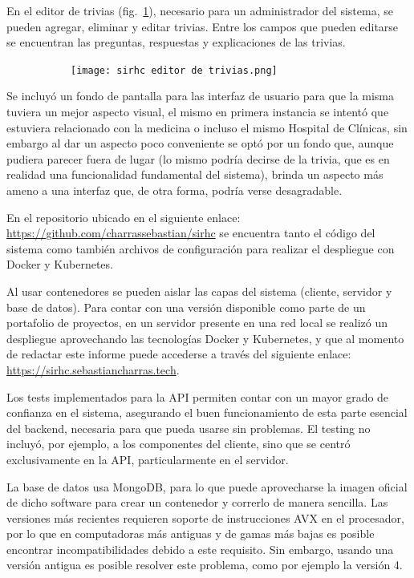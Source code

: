 \documentclass{article}
\begin{document}
\vspace{-1.0\baselineskip}
En el editor de trivias (fig.~\ref{fig:editorTrivias}), necesario para un administrador del sistema, se pueden agregar, eliminar y editar trivias. Entre los campos que pueden editarse se encuentran las preguntas, respuestas y explicaciones de las trivias.
\begin{figure}[H]
	\caption{Interfaz del editor de trivias}
    \begin{subfigure}{1\textwidth}
	\texttt{[image: sirhc editor de trivias.png]}
    \end{subfigure}
	\label{fig:editorTrivias}
\end{figure}
\vspace{-1.0\baselineskip}
Se incluyó un fondo de pantalla para las interfaz de usuario para que la misma tuviera un mejor aspecto visual, el mismo en primera instancia se intentó que estuviera relacionado con la medicina o incluso el mismo Hospital de Clínicas, sin embargo al dar un aspecto poco conveniente se optó por un fondo que, aunque pudiera parecer fuera de lugar (lo mismo podría decirse de la trivia, que es en realidad una funcionalidad fundamental del sistema), brinda un aspecto más ameno a una interfaz que, de otra forma, podría verse desagradable.

En el repositorio ubicado en el siguiente enlace: \href{https://github.com/charrassebastian/sirhc}{https://github.com/charrassebastian/sirhc} se encuentra tanto el código del sistema como también archivos de configuración para realizar el despliegue con Docker y Kubernetes.

Al usar contenedores se pueden aislar las capas del sistema (cliente, servidor y base de datos). Para contar con una versión disponible como parte de un portafolio de proyectos, en un servidor presente en una red local se realizó un despliegue aprovechando las tecnologías Docker y Kubernetes, y que al momento de redactar este informe puede accederse a través del siguiente enlace: \href{https://sirhc.sebastiancharras.tech}{https://sirhc.sebastiancharras.tech}.

Los tests implementados para la API permiten contar con un mayor grado de confianza en el sistema, asegurando el buen funcionamiento de esta parte esencial del backend, necesaria para que pueda usarse sin problemas. El testing no incluyó, por ejemplo, a los componentes del cliente, sino que se centró exclusivamente en la API, particularmente en el servidor.

La base de datos usa MongoDB, para lo que puede aprovecharse la imagen oficial de dicho software para crear un contenedor y correrlo de manera sencilla. Las versiones más recientes requieren soporte de instrucciones AVX en el procesador, por lo que en computadoras más antiguas y de gamas más bajas es posible encontrar incompatibilidades debido a este requisito. Sin embargo, usando una versión antigua es posible resolver este problema, como por ejemplo la versión 4.
\newpage
\end{document}
